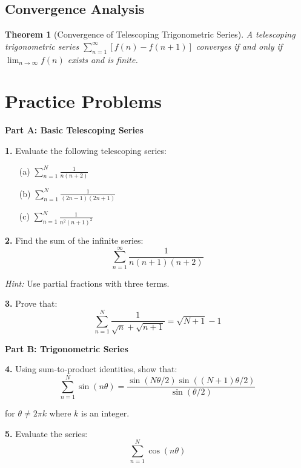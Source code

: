\documentclass[12pt]{article}
\newtheorem{theorem}{Theorem}
\begin{document}
\subsection{Convergence Analysis}

\begin{theorem}[Convergence of Telescoping Trigonometric Series]
A telescoping trigonometric series $\sum_{n=1}^{\infty} [f(n) - f(n+1)]$ converges if and only if $\lim_{n \to \infty} f(n)$ exists and is finite.
\end{theorem}

\newpage

\section{Practice Problems}

\textbf{Part A: Basic Telescoping Series}

\textbf{1.} Evaluate the following telescoping series:

\begin{enumerate}
\item[(a)] $\sum_{n=1}^{N} \frac{1}{n(n+2)}$
\vspace{3cm}

\item[(b)] $\sum_{n=1}^{N} \frac{1}{(2n-1)(2n+1)}$
\vspace{3cm}

\item[(c)] $\sum_{n=1}^{N} \frac{1}{n^2(n+1)^2}$
\vspace{3cm}
\end{enumerate}

\textbf{2.} Find the sum of the infinite series:
$$\sum_{n=1}^{\infty} \frac{1}{n(n+1)(n+2)}$$

\textit{Hint:} Use partial fractions with three terms.
\vspace{4cm}

\textbf{3.} Prove that:
$$\sum_{n=1}^{N} \frac{1}{\sqrt{n} + \sqrt{n+1}} = \sqrt{N+1} - 1$$
\vspace{4cm}

\textbf{Part B: Trigonometric Series}

\textbf{4.} Using sum-to-product identities, show that:
$$\sum_{n=1}^{N} \sin(n\theta) = \frac{\sin(N\theta/2)\sin((N+1)\theta/2)}{\sin(\theta/2)}$$

for $\theta \neq 2\pi k$ where $k$ is an integer.
\vspace{5cm}

\textbf{5.} Evaluate the series:
$$\sum_{n=1}^{N} \cos(n\theta)$$
\end{document}
